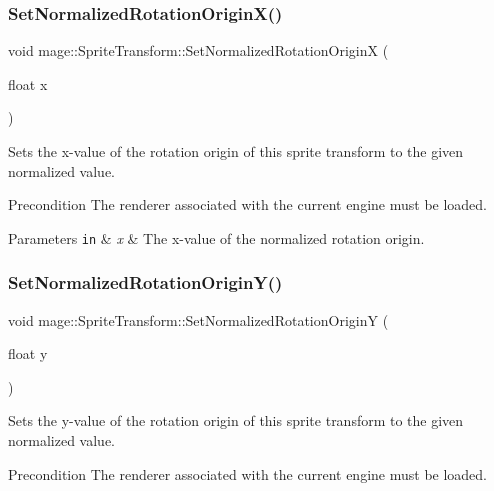 \subsubsection{\texorpdfstring{Set\+Normalized\+Rotation\+Origin\+X()}{SetNormalizedRotationOriginX()}}
{\footnotesize\ttfamily void mage\+::\+Sprite\+Transform\+::\+Set\+Normalized\+Rotation\+OriginX (\begin{DoxyParamCaption}\item[{float}]{x }\end{DoxyParamCaption})}

Sets the x-\/value of the rotation origin of this sprite transform to the given normalized value.

\begin{DoxyPrecond}{Precondition}
The renderer associated with the current engine must be loaded. 
\end{DoxyPrecond}

\begin{DoxyParams}[1]{Parameters}
\mbox{\tt in}  & {\em x} & The x-\/value of the normalized rotation origin. \\
\hline
\end{DoxyParams}
\hypertarget{structmage_1_1_sprite_transform_aee42a4fb1af7259fa0ee9116e43ba952}{}\label{structmage_1_1_sprite_transform_aee42a4fb1af7259fa0ee9116e43ba952} 
\subsubsection{\texorpdfstring{Set\+Normalized\+Rotation\+Origin\+Y()}{SetNormalizedRotationOriginY()}}
{\footnotesize\ttfamily void mage\+::\+Sprite\+Transform\+::\+Set\+Normalized\+Rotation\+OriginY (\begin{DoxyParamCaption}\item[{float}]{y }\end{DoxyParamCaption})}

Sets the y-\/value of the rotation origin of this sprite transform to the given normalized value.

\begin{DoxyPrecond}{Precondition}
The renderer associated with the current engine must be loaded. 
\end{DoxyPrecond}

